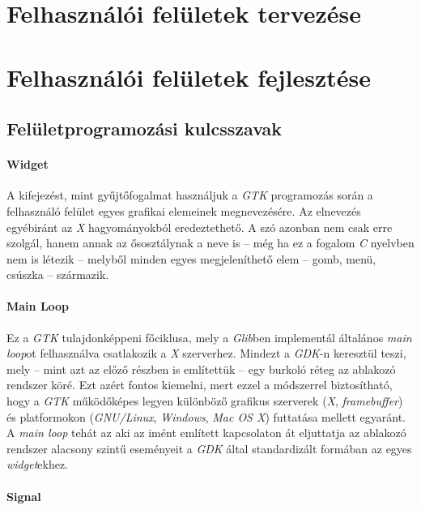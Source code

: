 \section{Felhasználói felületek tervezése}

\section{Felhasználói felületek fejlesztése}

\subsection{Felületprogramozási kulcsszavak}

\paragraph{Widget}

A kifejezést, mint gyűjtőfogalmat használjuk a \textit{GTK} programozás során a felhasználó felület egyes grafikai elemeinek megnevezésére. Az elnevezés egyébiránt az \textit{X} hagyományokból eredeztethető. A szó azonban nem csak erre szolgál, hanem annak az ősosztálynak a neve is -- még ha ez a fogalom \textit{C} nyelvben nem is létezik -- melyből minden egyes megjeleníthető elem -- gomb, menü, csúszka -- származik.

\paragraph{Main Loop}

Ez a \textit{GTK} tulajdonképpeni főciklusa, mely a \textit{Glib}ben implementál általános \textit{main loop}ot felhasználva csatlakozik a \textit{X} szerverhez. Mindezt a \textit{GDK}-n keresztül teszi, mely -- mint azt az előző részben is említettük -- egy burkoló réteg az ablakozó rendszer köré. Ezt azért fontos kiemelni, mert ezzel a módszerrel biztosítható, hogy a \textit{GTK} működőképes legyen különböző grafikus szerverek (\textit{X}, \textit{framebuffer}) és platformokon (\textit{GNU/Linux}, \textit{Windows}, \textit{Mac OS X}) futtatása mellett egyaránt. A \textit{main loop} tehát az aki az imént említett kapcsolaton át eljuttatja az ablakozó rendszer alacsony szintű eseményeit a \textit{GDK} által standardizált formában az egyes \textit{widget}ekhez.

\paragraph{Signal}


